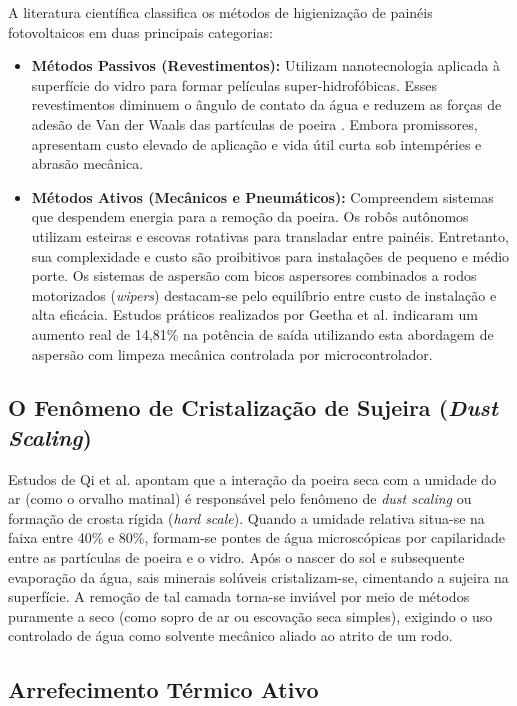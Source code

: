 \documentclass[12pt, a4paper]{article}
\begin{document}
A literatura científica classifica os métodos de higienização de painéis fotovoltaicos em duas principais categorias:
\begin{itemize}
    \item \textbf{Métodos Passivos (Revestimentos):} Utilizam nanotecnologia aplicada à superfície do vidro para formar películas super-hidrofóbicas. Esses revestimentos diminuem o ângulo de contato da água e reduzem as forças de adesão de Van der Waals das partículas de poeira \cite{qi2025}. Embora promissores, apresentam custo elevado de aplicação e vida útil curta sob intempéries e abrasão mecânica.
    \item \textbf{Métodos Ativos (Mecânicos e Pneumáticos):} Compreendem sistemas que despendem energia para a remoção da poeira. Os robôs autônomos utilizam esteiras e escovas rotativas para transladar entre painéis. Entretanto, sua complexidade e custo são proibitivos para instalações de pequeno e médio porte. Os sistemas de aspersão com bicos aspersores combinados a rodos motorizados (\textit{wipers}) destacam-se pelo equilíbrio entre custo de instalação e alta eficácia. Estudos práticos realizados por Geetha et al. \cite{geetha2024} indicaram um aumento real de 14,81\% na potência de saída utilizando esta abordagem de aspersão com limpeza mecânica controlada por microcontrolador.
\end{itemize}

\subsection{O Fenômeno de Cristalização de Sujeira (\textit{Dust Scaling})}

Estudos de Qi et al. \cite{qi2025} apontam que a interação da poeira seca com a umidade do ar (como o orvalho matinal) é responsável pelo fenômeno de \textit{dust scaling} ou formação de crosta rígida (\textit{hard scale}). Quando a umidade relativa situa-se na faixa entre 40\% e 80\%, formam-se pontes de água microscópicas por capilaridade entre as partículas de poeira e o vidro. Após o nascer do sol e subsequente evaporação da água, sais minerais solúveis cristalizam-se, cimentando a sujeira na superfície. A remoção de tal camada torna-se inviável por meio de métodos puramente a seco (como sopro de ar ou escovação seca simples), exigindo o uso controlado de água como solvente mecânico aliado ao atrito de um rodo.

\subsection{Arrefecimento Térmico Ativo}
\end{document}
